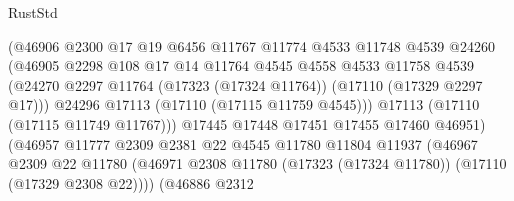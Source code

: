 \begin{lexlean}{RustStd}
\begin{coremodule}
                                  (@46906
                                    @2300
                                    @17
                                    @19
                                    @6456
                                    @11767
                                    @11774
                                    @4533
                                    @11748
                                    @4539
                                    @24260
                                    (@46905
                                      @2298
                                      @108
                                      @17
                                      @14
                                      @11764
                                      @4545
                                      @4558
                                      @4533
                                      @11758
                                      @4539
                                      (@24270
                                        @2297
                                        @11764
                                        (@17323 (@17324 @11764))
                                        (@17110 (@17329 @2297 @17)))
                                      @24296
                                      @17113
                                      (@17110 (@17115 @11759 @4545)))
                                    @17113
                                    (@17110 (@17115 @11749 @11767)))
                                  @17445
                                  @17448
                                  @17451
                                  @17455
                                  @17460
                                  @46951)
                                (@46957
                                  @11777
                                  @2309
                                  @2381
                                  @22
                                  @4545
                                  @11780
                                  @11804
                                  @11937
                                  (@46967
                                    @2309
                                    @22
                                    @11780
                                    (@46971
                                      @2308
                                      @11780
                                      (@17323 (@17324 @11780))
                                      (@17110 (@17329 @2308 @22))))
                                  (@46886
                                    @2312

\end{coremodule}
\end{lexlean}
